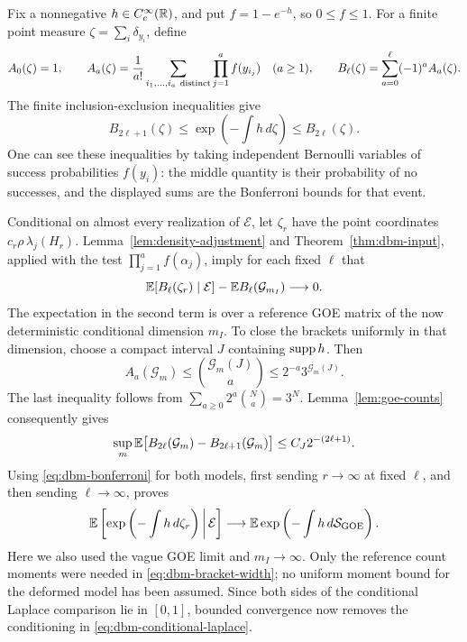Fix a nonnegative \(h\in C_c^\infty(\mathbb R)\), and put
\(f=1-e^{-h}\), so \(0\le f\le1\). For a finite point measure
\(\zeta=\sum_i\delta_{y_i}\), define
\[
 A_0(\zeta)=1,\qquad
 A_a(\zeta)=\frac1{a!}
    \sum_{i_1,\ldots,i_a\ {\rm distinct}}
        \prod_{j=1}^a f(y_{i_j})\quad(a\ge1),
 \qquad
 B_\ell(\zeta)=\sum_{a=0}^{\ell}(-1)^aA_a(\zeta).
\]
The finite inclusion-exclusion inequalities give
\begin{equation}
 \label{eq:dbm-bonferroni}
 B_{2\ell+1}(\zeta)
   \le \exp\left(-\int h\,d\zeta\right)
   \le B_{2\ell}(\zeta).
\end{equation}
One can see these inequalities by taking independent Bernoulli
variables of success probabilities \(f(y_i)\): the middle quantity
is their probability of no successes, and the displayed sums are
the Bonferroni bounds for that event.

Conditional on almost every realization of \(\mathcal E\), let \(\zeta_r\) have the point
coordinates \(c_r\rho\,\lambda_j(H_r)\).
Lemma~\ref{lem:density-adjustment} and Theorem~\ref{thm:dbm-input},
applied with the test \(\prod_{j=1}^a f(\alpha_j)\), imply for each
fixed \(\ell\) that
\[
 \mathbb E[B_\ell(\zeta_r)\mid\mathcal E]
       -\mathbb E B_\ell(\mathcal G_{m_I})\longrightarrow0.
\]
The expectation in the second term is over a reference GOE matrix
of the now deterministic conditional dimension \(m_I\).
To close the brackets uniformly in that dimension, choose a compact
interval \(J\) containing \(\operatorname{supp} h\). Then
\[
 A_a(\mathcal G_m)\le
     \binom{\mathcal G_m(J)}a
     \le 2^{-a}3^{\mathcal G_m(J)}.
\]
The last inequality follows from
\(\sum_{a\ge0}2^a\binom{N}{a}=3^N\).
Lemma~\ref{lem:goe-counts} consequently gives
\begin{equation}
 \label{eq:dbm-bracket-width}
 \sup_m\mathbb E\bigl[B_{2\ell}(\mathcal G_m)
                 -B_{2\ell+1}(\mathcal G_m)\bigr]
       \le C_J2^{-(2\ell+1)}.
\end{equation}
Using \eqref{eq:dbm-bonferroni} for both models, first sending
\(r\to\infty\) at fixed \(\ell\), and then sending
\(\ell\to\infty\), proves
\begin{equation}
 \label{eq:dbm-conditional-laplace}
 \mathbb E\left[\exp\left(-\int h\,d\zeta_r\right)\,\middle|\,\mathcal E\right]
   \longrightarrow
 \mathbb E\exp\left(-\int h\,d\mathcal S_{\mathrm{GOE}}\right).
\end{equation}
Here we also used the vague GOE limit and \(m_I\to\infty\).
Only the reference count moments were needed in
\eqref{eq:dbm-bracket-width}; no uniform moment bound for the
deformed model has been assumed. Since both sides of the conditional
Laplace comparison lie in \([0,1]\), bounded convergence now removes
the conditioning in \eqref{eq:dbm-conditional-laplace}.

